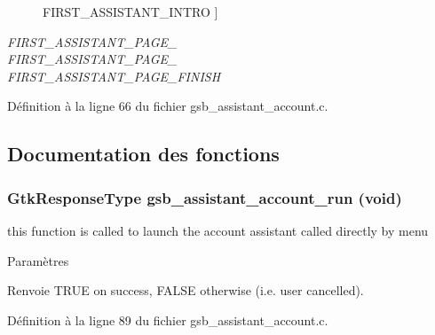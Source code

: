 \begin{Desc}
\begin{description}
{FIRST\_\-ASSISTANT\_\-INTRO\label{gsb__assistant__account_8c_a534a709ba3c1b8b898f949336c2d2ecaa9df2c40e561c1a5b46974460edea492e}
}]\item[{\em 
FIRST\_\-ASSISTANT\_\-PAGE\_\-2\label{gsb__assistant__account_8c_a534a709ba3c1b8b898f949336c2d2ecaa3efe228569181d03e959a1fefced13aa}
}]\item[{\em 
FIRST\_\-ASSISTANT\_\-PAGE\_\-3\label{gsb__assistant__account_8c_a534a709ba3c1b8b898f949336c2d2ecaacb4356954bb745ecbd6f1ba73e40e6d3}
}]\item[{\em 
FIRST\_\-ASSISTANT\_\-PAGE\_\-FINISH\label{gsb__assistant__account_8c_a534a709ba3c1b8b898f949336c2d2ecaa6fd91e61faa9e79f0c0ee14ead65d72f}
}]\end{description}
\end{Desc}



Définition à la ligne 66 du fichier gsb\_\-assistant\_\-account.c.



\subsection{Documentation des fonctions}
\subsubsection[{gsb\_\-assistant\_\-account\_\-run}]{\setlength{\rightskip}{0pt plus 5cm}GtkResponseType gsb\_\-assistant\_\-account\_\-run (void)}\label{gsb__assistant__account_8c_a8813f2fd12b26961beca70c591b499e1}
this function is called to launch the account assistant called directly by menu


\begin{DoxyParams}{Paramètres}
\item[{\em }]\end{DoxyParams}
\begin{DoxyReturn}{Renvoie}
TRUE on success, FALSE otherwise (i.e. user cancelled). 
\end{DoxyReturn}


Définition à la ligne 89 du fichier gsb\_\-assistant\_\-account.c.

